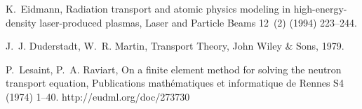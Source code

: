 \documentclass[xchauthor,chkrefs,fixeqskip,GCNS,amsmath,amsthm]{yjcphg}
\theoremstyle{remark}
\begin{document}
\begin{backmatter}
\begin{thebibliography}{}
\begin{bsubitem}
\begin{bcontribution}%
\end{bcontribution}
\begin{bhost}
\begin{bissue}
\end{bissue}
\end{bhost}
\end{bsubitem}
%
\OrigBibText
K.~Eidmann, Radiation transport and atomic physics modeling in
high-energy-density laser-produced plasmas, Laser and Particle Beams
12~(2) (1994) 223--244.
\endOrigBibText
{}%
\endbibitem

\begin{bsubitem}
\begin{bcontribution}%
\end{bcontribution}
\begin{bhost}
\begin{bbook}
\end{bbook}
\end{bhost}
\end{bsubitem}
%
\OrigBibText
J.~J. Duderstadt, W.~R. Martin, Transport Theory, John Wiley \& Sons,
1979.
\endOrigBibText
{}%
\endbibitem

\begin{bsubitem}
\begin{bcontribution}%
\end{bcontribution}
\begin{bhost}
\begin{bissue}
\end{bissue}
\end{bhost}
\begin{bhost}
\begin{behost}
\end{behost}
\end{bhost}
\end{bsubitem}
%
\OrigBibText
P.~Lesaint, P.~A. Raviart, On a finite
element method for solving the neutron transport equation, Publications
math\'ematiques et informatique de Rennes S4 (1974) 1--40.
http://eudml.org/doc/273730
\endOrigBibText
{}%
\endbibitem


\end{thebibliography}
\end{backmatter}
\end{document}
